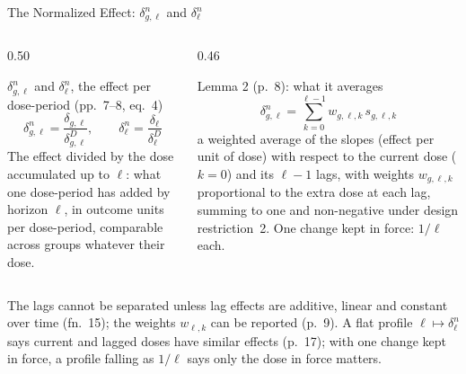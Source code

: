 \documentclass[main.tex]{subfiles}
\begin{document}
\begin{frame}{The Normalized Effect: $\delta^{n}_{g,\ell}$ and $\delta^{n}_\ell$}

  \begin{columns}[T]
    \begin{column}{0.50\textwidth}
      \begin{defbox}{$\delta^{n}_{g,\ell}$ and $\delta^{n}_\ell$, the effect per dose-period (pp.~7--8, eq.~4)}
        \footnotesize
        \[
          \delta^{n}_{g,\ell} = \frac{\delta_{g,\ell}}{\delta^{D}_{g,\ell}},
          \qquad
          \delta^{n}_\ell = \frac{\delta_\ell}{\delta^{D}_\ell}
        \]
        The effect divided by the dose accumulated up to $\ell$: what one
        dose-period has added by horizon $\ell$, in outcome units per
        dose-period, comparable across groups whatever their dose.
      \end{defbox}
    \end{column}
    \begin{column}{0.46\textwidth}
      \begin{block}{\footnotesize Lemma 2 (p.~8): what it averages}
        \footnotesize
        \[
          \delta^{n}_{g,\ell} = \sum_{k=0}^{\ell-1} w_{g,\ell,k}\, s_{g,\ell,k}
        \]
        a weighted average of the slopes (effect per unit of dose) with
        respect to the current dose ($k=0$) and its $\ell-1$ lags, with
        weights $w_{g,\ell,k}$ proportional to the extra dose at each lag,
        summing to one and non-negative under design restriction~2. One
        change kept in force: $1/\ell$ each.
      \end{block}
    \end{column}
  \end{columns}

  \medskip
  \footnotesize The lags cannot be separated unless lag effects are additive,
  linear and constant over time (fn.~15); the weights $w_{\ell,k}$ can be
  reported (p.~9). A flat profile $\ell \mapsto \delta^{n}_\ell$ says current
  and lagged doses have similar effects (p.~17); with one change kept in
  force, a profile falling as $1/\ell$ says only the dose in force matters.

\end{frame}
\end{document}
